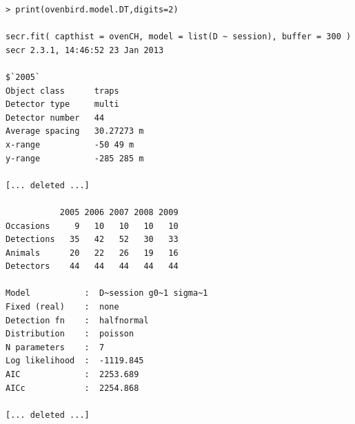 {\small
\begin{verbatim}
> print(ovenbird.model.DT,digits=2)

secr.fit( capthist = ovenCH, model = list(D ~ session), buffer = 300 )
secr 2.3.1, 14:46:52 23 Jan 2013

$`2005`
Object class      traps 
Detector type     multi 
Detector number   44 
Average spacing   30.27273 m 
x-range           -50 49 m 
y-range           -285 285 m 

[... deleted ...]

           2005 2006 2007 2008 2009
Occasions     9   10   10   10   10
Detections   35   42   52   30   33
Animals      20   22   26   19   16
Detectors    44   44   44   44   44

Model           :  D~session g0~1 sigma~1 
Fixed (real)    :  none 
Detection fn    :  halfnormal 
Distribution    :  poisson 
N parameters    :  7 
Log likelihood  :  -1119.845 
AIC             :  2253.689 
AICc            :  2254.868 

[... deleted ...]
\end{verbatim}
}

